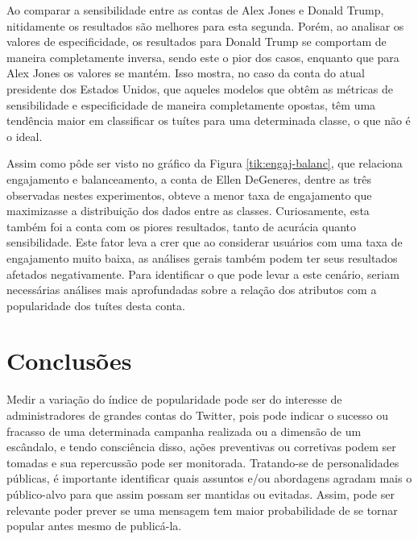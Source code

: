 \documentclass[oneside,openright,12pt]{ufsm_2015} %
\begin{document}
    \par Ao comparar a sensibilidade entre as contas de Alex Jones e Donald Trump, nitidamente os resultados são melhores para esta segunda. Porém, ao analisar os valores de especificidade, os resultados para Donald Trump se comportam de maneira completamente inversa, sendo este o pior dos casos, enquanto que para Alex Jones os valores se mantém. Isso mostra, no caso da conta do atual presidente dos Estados Unidos, que aqueles modelos que obtêm as métricas de sensibilidade e especificidade de maneira completamente opostas, têm uma tendência maior em classificar os tuítes para uma determinada classe, o que não é o ideal.
    
    \par Assim como pôde ser visto no gráfico da Figura \ref{tik:engaj-balanc}, que relaciona engajamento e balanceamento, a conta de Ellen DeGeneres, dentre as três observadas nestes experimentos, obteve a menor taxa de engajamento que maximizasse a distribuição dos dados entre as classes. Curiosamente, esta também foi a conta com os piores resultados, tanto de acurácia quanto sensibilidade. Este fator leva a crer que ao considerar usuários com uma taxa de engajamento muito baixa, as análises gerais também podem ter seus resultados afetados negativamente. Para identificar o que pode levar a este cenário, seriam necessárias análises mais aprofundadas sobre a relação dos atributos com a popularidade dos tuítes desta conta.


\chapter{Conclusões}
\label{sec:conclusao}

    \par Medir a variação do índice de popularidade pode ser do interesse de administradores de grandes contas do Twitter, pois pode indicar o sucesso ou fracasso de uma determinada campanha realizada ou a dimensão de um escândalo, e tendo consciência disso, ações preventivas ou corretivas podem ser tomadas e sua repercussão pode ser monitorada. Tratando-se de personalidades públicas, é importante identificar quais assuntos e/ou abordagens agradam mais o público-alvo para que assim possam ser mantidas ou evitadas. Assim, pode ser relevante poder prever se uma mensagem tem maior probabilidade de se tornar popular antes mesmo de publicá-la.
    
\end{document}
